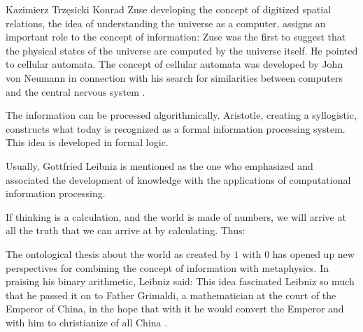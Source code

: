 \begin{artengenv}{Kazimierz Trzęsicki}
Konrad Zuse \parencite*[p.5]{Zuse2012a} developing the concept of digitized spatial relations, the idea of understanding the universe as a computer, assigns an important role to the concept of information:  Zuse was the first to suggest that the physical states of the universe are computed by the universe itself. He pointed to cellular automata. The concept of cellular automata was developed by John von Neumann in connection with his search for similarities between computers and the central nervous system \parencite{vonNeumann1951,vonNeumann1958,vonNeumann2012, Neumann1966,Shannon1958}.

The information can be processed algorithmically. Aristotle, creating a syllogistic, constructs what  today is recognized as a formal information processing system. This idea is developed in formal logic.



Usually, Gottfried Leibniz is mentioned as the one who emphasized and associated the development of knowledge with the applications of computational information processing.

If thinking is a calculation, and the world is made of numbers, we will arrive at all the truth that we can arrive at by calculating. Thus: 

The ontological thesis about the world as created by $1$ with $0$ has opened up new perspectives for combining the concept of information with metaphysics. In praising his binary arithmetic, Leibniz \parencite*{Leibniz1990} said: 
This idea fascinated Leibniz so much that he passed it on to Father Grimaldi, a mathematician at the court of the Emperor of China, in the hope that with it he would convert the Emperor and with him to christianize of all China \parencite{list1697}.


\end{artengenv}
